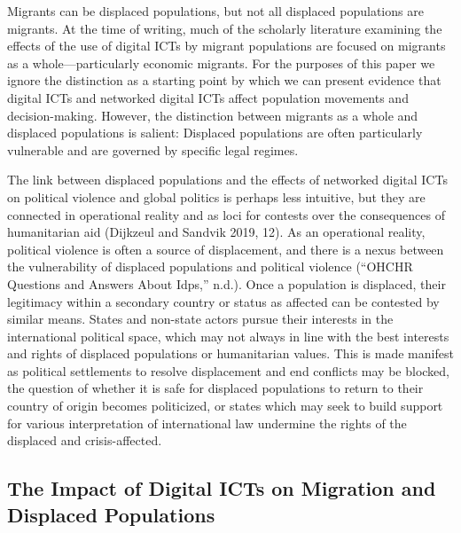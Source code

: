 Migrants can be displaced populations, but not all displaced populations
are migrants. At the time of writing, much of the scholarly literature
examining the effects of the use of digital ICTs by migrant populations
are focused on migrants as a whole---particularly economic migrants. For
the purposes of this paper we ignore the distinction as a starting point
by which we can present evidence that digital ICTs and networked digital
ICTs affect population movements and decision-making. However, the
distinction between migrants as a whole and displaced populations is
salient: Displaced populations are often particularly vulnerable and are
governed by specific legal regimes.

The link between displaced populations and the effects of networked
digital ICTs on political violence and global politics is perhaps less
intuitive, but they are connected in operational reality and as loci for
contests over the consequences of humanitarian aid (Dijkzeul and Sandvik
2019, 12). As an operational reality, political violence is often a
source of displacement, and there is a nexus between the vulnerability
of displaced populations and political violence (``OHCHR Questions and
Answers About Idps,'' n.d.). Once a population is displaced, their
legitimacy within a secondary country or status as affected can be
contested by similar means. States and non-state actors pursue their
interests in the international political space, which may not always in
line with the best interests and rights of displaced populations or
humanitarian values. This is made manifest as political settlements to
resolve displacement and end conflicts may be blocked, the question of
whether it is safe for displaced populations to return to their country
of origin becomes politicized, or states which may seek to build support
for various interpretation of international law undermine the rights of
the displaced and crisis-affected.

\hypertarget{the-impact-of-digital-icts-on-migration-and-displaced-populations}{%
\subsection{The Impact of Digital ICTs on Migration and Displaced
Populations}\label{the-impact-of-digital-icts-on-migration-and-displaced-populations}}

